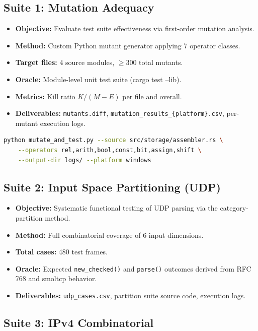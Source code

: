 \documentclass[11pt,a4paper]{article}
\begin{document}
\subsection{Suite 1: Mutation Adequacy}

\begin{itemize}[noitemsep]
\item \textbf{Objective:} Evaluate test suite effectiveness via first-order mutation analysis.
\item \textbf{Method:} Custom Python mutant generator applying 7 operator classes.
\item \textbf{Target files:} 4 source modules, $\geq$300 total mutants.
\item \textbf{Oracle:} Module-level unit test suite (cargo test --lib).
\item \textbf{Metrics:} Kill ratio $K/(M-E)$ per file and overall.
\item \textbf{Deliverables:} \texttt{mutants.diff}, \texttt{mutation\_results\_\{platform\}.csv}, per-mutant execution logs.
\end{itemize}

\begin{lstlisting}[language=bash, caption={Mutation testing invocation.}]
python mutate_and_test.py --source src/storage/assembler.rs \
    --operators rel,arith,bool,const,bit,assign,shift \
    --output-dir logs/ --platform windows
\end{lstlisting}

\subsection{Suite 2: Input Space Partitioning (UDP)}

\begin{itemize}[noitemsep]
\item \textbf{Objective:} Systematic functional testing of UDP parsing via the category-partition method.
\item \textbf{Method:} Full combinatorial coverage of 6 input dimensions.
\item \textbf{Total cases:} 480 test frames.
\item \textbf{Oracle:} Expected \texttt{new\_checked()} and \texttt{parse()} outcomes derived from RFC 768 and smoltcp behavior.
\item \textbf{Deliverables:} \texttt{udp\_cases.csv}, partition suite source code, execution logs.
\end{itemize}

\subsection{Suite 3: IPv4 Combinatorial}
\end{document}

